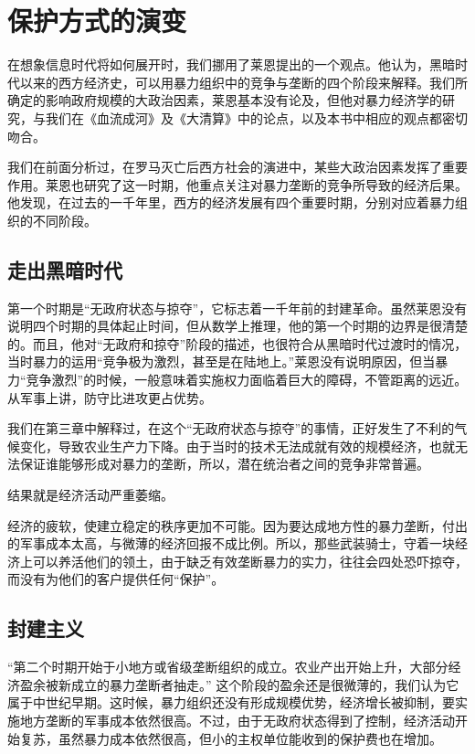 \section{保护方式的演变}
在想象信息时代将如何展开时，我们挪用了莱恩提出的一个观点。他认为，黑暗时代以来的西方经济史，可以用暴力组织中的竞争与垄断的四个阶段来解释。我们所确定的影响政府规模的大政治因素，莱恩基本没有论及，但他对暴力经济学的研究，与我们在《血流成河》及《大清算》中的论点，以及本书中相应的观点都密切吻合。

我们在前面分析过，在罗马灭亡后西方社会的演进中，某些大政治因素发挥了重要作用。莱恩也研究了这一时期，他重点关注对暴力垄断的竞争所导致的经济后果。他发现，在过去的一千年里，西方的经济发展有四个重要时期，分别对应着暴力组织的不同阶段。

\subsection{走出黑暗时代}
第一个时期是“无政府状态与掠夺”，它标志着一千年前的封建革命。虽然莱恩没有说明四个时期的具体起止时间，但从数学上推理，他的第一个时期的边界是很清楚的。而且，他对“无政府和掠夺”阶段的描述，也很符合从黑暗时代过渡时的情况，当时暴力的运用“竞争极为激烈，甚至是在陆地上。”莱恩没有说明原因，但当暴力“竞争激烈”的时候，一般意味着实施权力面临着巨大的障碍，不管距离的远近。从军事上讲，防守比进攻更占优势。

我们在第三章中解释过，在这个“无政府状态与掠夺”的事情，正好发生了不利的气候变化，导致农业生产力下降。由于当时的技术无法成就有效的规模经济，也就无法保证谁能够形成对暴力的垄断，所以，潜在统治者之间的竞争非常普遍。

结果就是经济活动严重萎缩。

经济的疲软，使建立稳定的秩序更加不可能。因为要达成地方性的暴力垄断，付出的军事成本太高，与微薄的经济回报不成比例。所以，那些武装骑士，守着一块经济上可以养活他们的领土，由于缺乏有效垄断暴力的实力，往往会四处恐吓掠夺，而没有为他们的客户提供任何“保护”。

\subsection{封建主义}

“第二个时期开始于小地方或省级垄断组织的成立。农业产出开始上升，大部分经济盈余被新成立的暴力垄断者抽走。” 这个阶段的盈余还是很微薄的，我们认为它属于中世纪早期。这时候，暴力组织还没有形成规模优势，经济增长被抑制，要实施地方垄断的军事成本依然很高。不过，由于无政府状态得到了控制，经济活动开始复苏，虽然暴力成本依然很高，但小的主权单位能收到的保护费也在增加。

